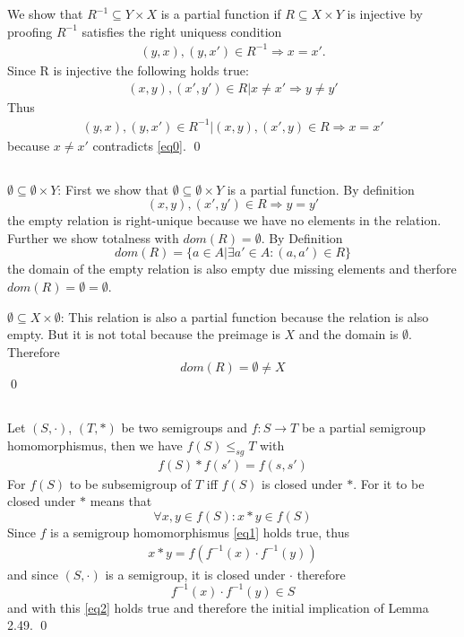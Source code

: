 \documentclass[a4paper,12pt,numbers=noenddot]{scrreport}
\begin{document}
\chapter{}
\section{}
We show that $R^{-1} \subseteq Y \times X$ is a partial function if $R \subseteq X \times Y$ is injective by proofing $R^{-1}$ satisfies the right uniquess condition
\begin{align*}
    (y,x), (y,x') \in R^{-1} \Rightarrow x = x'.
\end{align*}
Since R is injective the following holds true:
\begin{align*}
    (x,y), (x',y') \in R | x \neq x' \Rightarrow y \neq y'\label{eq0}\tag{1}
\end{align*}
Thus 
\begin{align*}
    (y,x), (y,x') \in R^{-1} | (x,y), (x', y) \in R  \Rightarrow x = x'
\end{align*}
because $x \neq x'$ contradicts \eqref{eq0}.
\qed

\section{}
$\emptyset \subseteq \emptyset \times Y$:
First we show that $\emptyset \subseteq \emptyset \times Y$ is a partial function.
By definition $$(x,y), (x',y') \in R \Rightarrow y = y'$$ the empty relation is right-unique because we have no elements in the relation.
Further we show totalness with $dom(R) = \emptyset$.
By Definition
$$dom(R) = \{a \in A | \exists a' \in A: (a,a') \in R\}$$
the domain of the empty relation is also empty due missing elements and therfore $dom(R) = \emptyset = \emptyset$.

\vspace{1cm}
$\emptyset \subseteq X \times \emptyset$: This relation is also a partial function because the relation is also empty.
But it is not total because the preimage is $X$ and the domain is $\emptyset$.
Therefore
$$dom(R) = \emptyset \neq X$$
\qed

\section{}
Let $(S, \cdot)$, $(T, *)$ be two semigroups and $f: S \rightarrow T$ be a partial semigroup homomorphismus, then we have $f(S) \leq_{sg} T$ with
\begin{align}
    f(S) * f(s') = f(s, s') \label{eq1}\tag{1}
\end{align}
For $f(S)$ to be subsemigroup of $T$ iff $f(S)$ is closed under $*$.
For it to be closed under $*$ means that 
$$\forall x,y \in f(S) : x * y \in f(S)$$
Since $f$ is a semigroup homomorphismus \eqref{eq1} holds true, thus
\begin{align}
    x * y = f(f^{-1}(x) \cdot f^{-1}(y)) \label{eq2}\tag{2}
\end{align}
and since $(S, \cdot)$ is a semigroup, it is closed under $\cdot$ therefore
$$f^{-1}(x) \cdot f^{-1}(y) \in S$$
and with this \eqref{eq2} holds true and therefore the initial implication of Lemma 2.49.
\qed

\section{}
\end{document}
